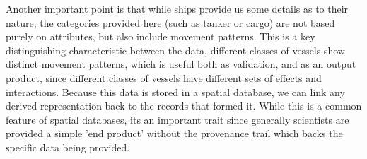 


Another important point is that while ships provide us some details as to their nature, the categories provided here (such as tanker or cargo) are not based purely on attributes, but also include movement patterns. This is a key distinguishing characteristic between the data, different classes of vessels show distinct movement patterns, which is useful both as validation, and as an output product, since different classes of vessels have different sets of effects and interactions. Because this data is stored in a spatial database, we can link any derived representation back to the records that formed it. While this is a common feature of spatial databases, its an important trait since generally scientists are provided a simple 'end product' without the provenance trail which backs the specific data being provided.


